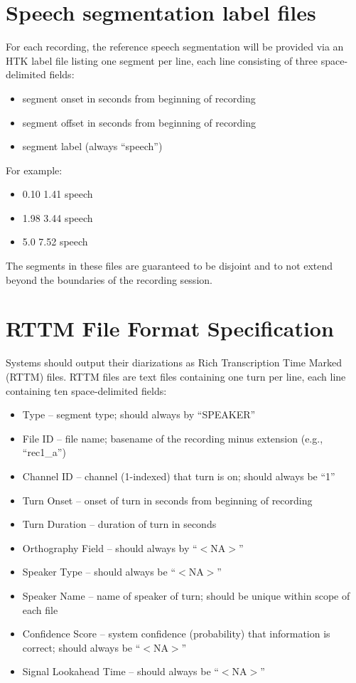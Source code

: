 \documentclass{article}
\begin{document}
\begin{appendices}
\newpage
\section{Speech segmentation label files}
\label{app:sad}
For each recording, the reference speech segmentation will be provided via an HTK label file listing one segment per line, each line consisting of three space-delimited fields:
    \begin{itemize}
        \item segment onset in seconds from beginning of recording
        \item segment offset in seconds from beginning of recording
        \item segment label (always ``speech'')
    \end{itemize}
For example:
    \begin{itemize}
        \item[] 0.10 1.41 speech
        \item[] 1.98 3.44 speech
        \item[] 5.0 7.52 speech
    \end{itemize}
The segments in these files are guaranteed to be disjoint and to not extend beyond the boundaries of the recording session.




\newpage
\section{RTTM File Format Specification}
\label{app:rttm}
Systems should output their diarizations as Rich Transcription Time Marked (RTTM) files. RTTM files are text files containing one turn per line, each line containing ten space-delimited fields:

\begin{itemize}
    \item Type  --  segment type; should always by ``SPEAKER''
    \item File ID  --  file name; basename of the recording minus extension (e.g., ``rec1\_a'')
    \item Channel ID  --  channel (1-indexed) that turn is on; should always be ``1''
    \item Turn Onset  --  onset of turn in seconds from beginning of recording
    \item Turn Duration  -- duration of turn in seconds
    \item Orthography Field --  should always by ``$<$NA$>$''
    \item Speaker Type  --  should always be ``$<$NA$>$''
    \item Speaker Name  --  name of speaker of turn; should be unique within scope of each file
    \item Confidence Score  --  system confidence (probability) that information is correct; should always be ``$<$NA$>$''
    \item Signal Lookahead Time  --  should always be ``$<$NA$>$''
\end{itemize}


\end{appendices}
\end{document}

